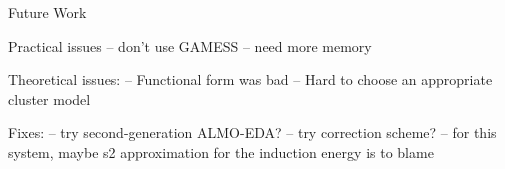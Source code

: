 \begin{section}{Future Work}
\label{sec:lmoeda-future_work}

Practical issues
-- don't use GAMESS
-- need more memory

Theoretical issues:
-- Functional form was bad
-- Hard to choose an appropriate cluster model

Fixes:
-- try second-generation ALMO-EDA?
-- try \sapt correction scheme?
-- for this system, maybe s2 approximation for the induction energy is to
blame

\end{section}
